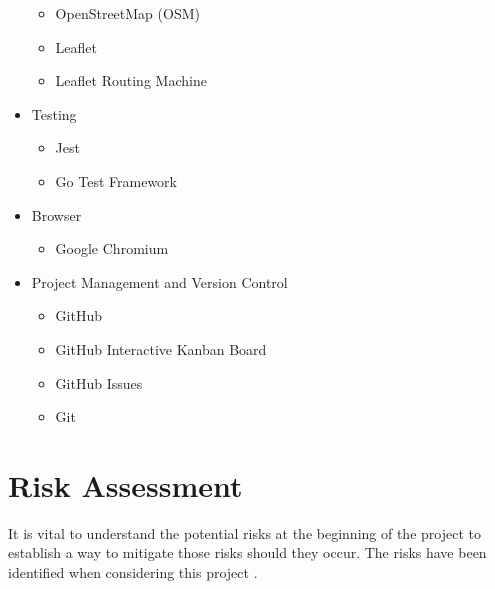 \begin{itemize}
\begin{itemize}
        \item OpenStreetMap (OSM)
        \item Leaflet
        \item Leaflet Routing Machine
    \end{itemize}
    \item Testing
    \begin{itemize}
        \item Jest
        \item Go Test Framework
    \end{itemize}
    \item Browser
    \begin{itemize}
        \item Google Chromium
    \end{itemize}
    \item Project Management and Version Control
    \begin{itemize}
        \item GitHub
        \item GitHub Interactive Kanban Board
        \item GitHub Issues
        \item Git
    \end{itemize}
\end{itemize}

\section{Risk Assessment}
\label{intro:riskassessment}

It is vital to understand the potential risks at the beginning of the project to establish a way to mitigate those risks should they occur. The risks have been identified when considering this project .

